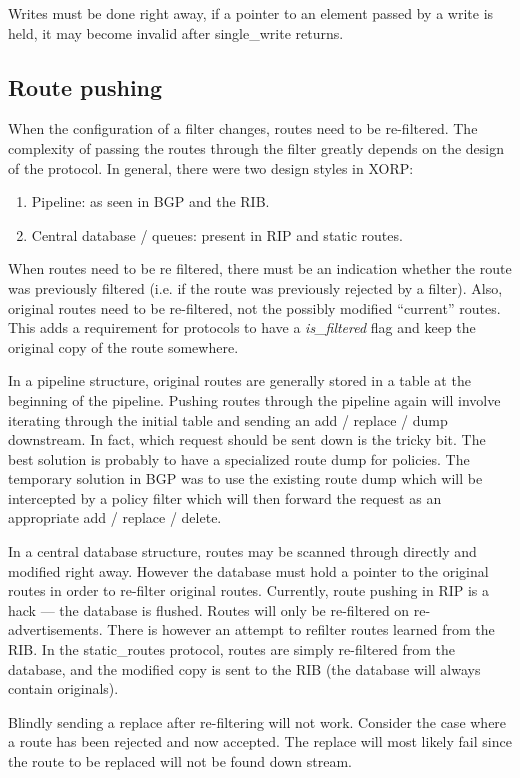 \documentclass{article}
\begin{document}
Writes must be done right away, if a pointer to an element passed by a write is
held, it may become invalid after single\_write returns.


\subsection{\label{rpush}Route pushing}
When the configuration of a filter changes, routes need to be re-filtered. The
complexity of passing the routes through the filter greatly depends on the
design of the protocol. In general, there were two design styles in XORP:
\begin{enumerate}
\item Pipeline: as seen in BGP and the RIB.
\item Central database / queues: present in RIP and static routes.
\end{enumerate}

When routes need to be re filtered, there must be an indication whether the
route was previously filtered (i.e. if the route was previously rejected by a
filter). Also, original routes need to be re-filtered, not the possibly modified
``current'' routes. This adds a requirement for protocols to have a {\em
is\_filtered} flag and keep the original copy of the route somewhere.

In a pipeline structure, original routes are generally stored in a table at the
beginning of the pipeline. Pushing routes through the pipeline again will
involve iterating through the initial table and sending an add / replace / dump
downstream. In fact, which request should be sent down is the tricky bit. The
best solution is probably to have a specialized route dump for policies. The
temporary solution in BGP was to use the existing route dump which will be
intercepted by a policy filter which will then forward the request as an
appropriate add / replace / delete.

In a central database structure, routes may be scanned through directly and
modified right away. However the database must hold a pointer to the original
routes in order to re-filter original routes. Currently, route pushing in RIP is
a hack --- the database is flushed. Routes will only be re-filtered on
re-advertisements. There is however an attempt to refilter routes learned from
the RIB. In the static\_routes protocol, routes are simply re-filtered from the
database, and the modified copy is sent to the RIB (the database will always
contain originals).

Blindly sending a replace after re-filtering will not work. Consider the case
where a route has been rejected and now accepted. The replace will most likely
fail since the route to be replaced will not be found down stream.
\end{document}
